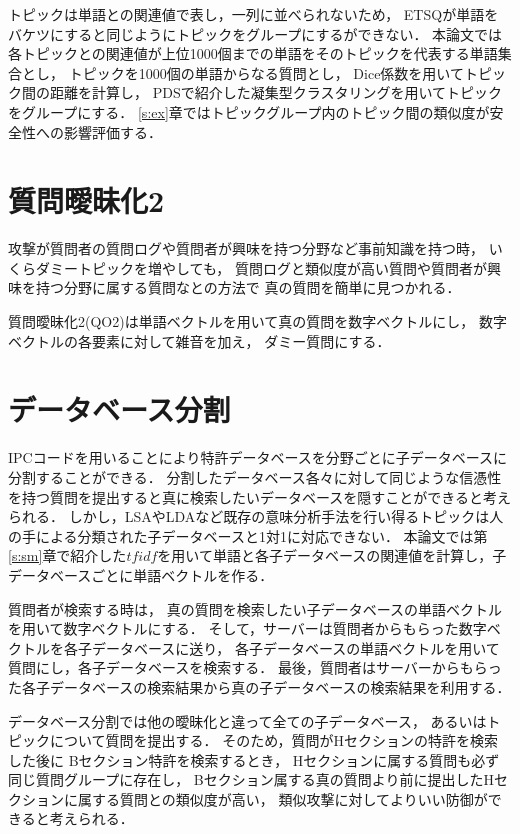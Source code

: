 \documentclass[master]{suribt}
\theoremstyle{definition}
\begin{document}
 トピックは単語との関連値で表し，一列に並べられないため，
 ETSQが単語をバケツにすると同じようにトピックをグループにするができない．
 本論文では各トピックとの関連値が上位1000個までの単語をそのトピックを代表する単語集合とし，
 トピックを1000個の単語からなる質問とし，
 Dice係数を用いてトピック間の距離を計算し，
 PDSで紹介した凝集型クラスタリングを用いてトピックをグループにする．
 \ref{s:ex}章ではトピックグループ内のトピック間の類似度が安全性への影響評価する．

 
 \section{質問曖昧化2}
 攻撃が質問者の質問ログや質問者が興味を持つ分野など事前知識を持つ時，
 いくらダミートピックを増やしても，
 質問ログと類似度が高い質問や質問者が興味を持つ分野に属する質問なとの方法で
 真の質問を簡単に見つかれる．

 質問曖昧化2(QO2)は単語ベクトルを用いて真の質問を数字ベクトルにし，
 数字ベクトルの各要素に対して雑音を加え，
 ダミー質問にする．

 
 \section{データベース分割}
 IPCコードを用いることにより特許データベースを分野ごとに子データベースに分割することができる．
 分割したデータベース各々に対して同じような信憑性を持つ質問を提出すると真に検索したいデータベースを隠すことができると考えられる．
 しかし，LSAやLDAなど既存の意味分析手法を行い得るトピックは人の手による分類された子データベースと1対1に対応できない．
 本論文では第\ref{s:sm}章で紹介した$tfidf$を用いて単語と各子データベースの関連値を計算し，子データベースごとに単語ベクトルを作る．

 質問者が検索する時は，
 真の質問を検索したい子データベースの単語ベクトルを用いて数字ベクトルにする．
 そして，サーバーは質問者からもらった数字ベクトルを各子データベースに送り，
 各子データベースの単語ベクトルを用いて質問にし，各子データベースを検索する．
 最後，質問者はサーバーからもらった各子データベースの検索結果から真の子データベースの検索結果を利用する．
 
 データベース分割では他の曖昧化と違って全ての子データベース，
 あるいはトピックについて質問を提出する．
 そのため，質問がHセクションの特許を検索した後に
 Bセクション特許を検索するとき，
 Hセクションに属する質問も必ず同じ質問グループに存在し，
 Bセクション属する真の質問より前に提出したHセクションに属する質問との類似度が高い，
 類似攻撃に対してよりいい防御ができると考えられる．
\end{document}
